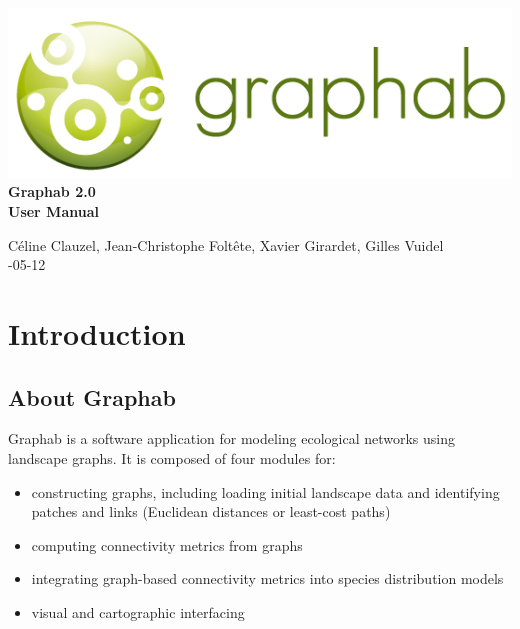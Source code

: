 \documentclass{article}
\begin{document}
\begin{titlepage}

	\centering
	\includegraphics[scale=0.5]{img/logo.png}\\
	
	\bigskip
	\bigskip
	\bigskip	
	{\Huge
	\bfseries
	Graphab 2.0\\
	\bigskip
	User Manual\\
	}
	\bigskip
	\bigskip
	\bigskip
	\bigskip
	\bigskip
			
	{\Large		
	Céline Clauzel, Jean-Christophe Foltête, Xavier Girardet, Gilles Vuidel\\
	-05-12\\
	}
	
\end{titlepage}

\setcounter{tocdepth}{2}
\tableofcontents

\pagebreak

\section{Introduction}

\subsection{About Graphab}

Graphab is a software application for modeling ecological networks using landscape graphs. It is composed of four modules for:
\begin{itemize}
	\item constructing graphs, including loading initial landscape data and identifying patches and links (Euclidean distances or least-cost paths)
	\item computing connectivity metrics from graphs
	\item integrating graph-based connectivity metrics into species distribution models
	\item visual and cartographic interfacing 
\end{itemize}
\end{document}

